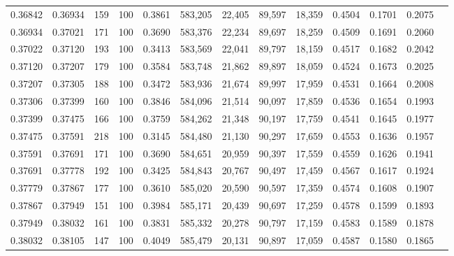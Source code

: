 \begin{tabular}{rrrrrrrrrrrrr}
0.36842 & 0.36934 &   159 & 100 &                                     0.3861 & 583,205 &  22,405 &  89,597 &  18,359 & 0.4504 & 0.1701 & 0.2075 \\
0.36934 & 0.37021 &   171 & 100 &                                     0.3690 & 583,376 &  22,234 &  89,697 &  18,259 & 0.4509 & 0.1691 & 0.2060 \\
0.37022 & 0.37120 &   193 & 100 &                                     0.3413 & 583,569 &  22,041 &  89,797 &  18,159 & 0.4517 & 0.1682 & 0.2042 \\
0.37120 & 0.37207 &   179 & 100 &                                     0.3584 & 583,748 &  21,862 &  89,897 &  18,059 & 0.4524 & 0.1673 & 0.2025 \\
0.37207 & 0.37305 &   188 & 100 &                                     0.3472 & 583,936 &  21,674 &  89,997 &  17,959 & 0.4531 & 0.1664 & 0.2008 \\
0.37306 & 0.37399 &   160 & 100 &                                     0.3846 & 584,096 &  21,514 &  90,097 &  17,859 & 0.4536 & 0.1654 & 0.1993 \\
0.37399 & 0.37475 &   166 & 100 &                                     0.3759 & 584,262 &  21,348 &  90,197 &  17,759 & 0.4541 & 0.1645 & 0.1977 \\
0.37475 & 0.37591 &   218 & 100 &                                     0.3145 & 584,480 &  21,130 &  90,297 &  17,659 & 0.4553 & 0.1636 & 0.1957 \\
0.37591 & 0.37691 &   171 & 100 &                                     0.3690 & 584,651 &  20,959 &  90,397 &  17,559 & 0.4559 & 0.1626 & 0.1941 \\
0.37691 & 0.37778 &   192 & 100 &                                     0.3425 & 584,843 &  20,767 &  90,497 &  17,459 & 0.4567 & 0.1617 & 0.1924 \\
0.37779 & 0.37867 &   177 & 100 &                                     0.3610 & 585,020 &  20,590 &  90,597 &  17,359 & 0.4574 & 0.1608 & 0.1907 \\
0.37867 & 0.37949 &   151 & 100 &                                     0.3984 & 585,171 &  20,439 &  90,697 &  17,259 & 0.4578 & 0.1599 & 0.1893 \\
0.37949 & 0.38032 &   161 & 100 &                                     0.3831 & 585,332 &  20,278 &  90,797 &  17,159 & 0.4583 & 0.1589 & 0.1878 \\
0.38032 & 0.38105 &   147 & 100 &                                     0.4049 & 585,479 &  20,131 &  90,897 &  17,059 & 0.4587 & 0.1580 & 0.1865 \\

\end{tabular}
